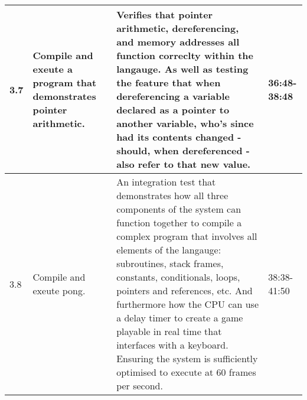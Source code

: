 \begin{longtable}{|p{1cm}|p{5cm}|p{5cm}|p{2cm}|}
    \hline
        3.7
        & 
        Compile and exeute a program that demonstrates pointer arithmetic. 
        &   
        Verifies that pointer arithmetic, dereferencing, and memory addresses all function correclty within the langauge. As well as testing the feature that when dereferencing a variable declared as a pointer to another variable, who's since had its contents changed - should, when dereferenced - also refer to that new value. 
        & 
        36:48-38:48
        \\
    \hline
        3.8
        & 
        Compile and exeute pong. 
        &   
        An integration test that demonstrates how all three components of the system can function together to compile a complex program that involves all elements of the langauge: subroutines, stack frames, constants, conditionals, loops, pointers and references, etc. And furthermore how the CPU can use a delay timer to create a game playable in real time that interfaces with a keyboard. Ensuring the system is sufficiently optimised to execute at 60 frames per second. 
        & 
        38:38-41:50
        \\
    \hline
\end{longtable}